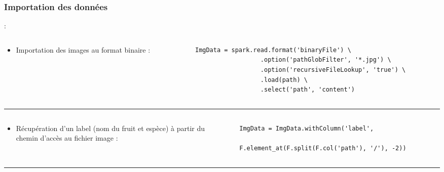 \documentclass[8pt,aspectratio=169,hyperref={unicode=true}]{beamer}
\begin{document}
\subsubsection{Importation des données}
\begin{frame}[fragile]{\insertsubsection : \insertsubsubsection}
  \begin{columns}
    \begin{column}{.25\textwidth}
      \begin{itemize}
        \item Importation des images au format binaire :
      \end{itemize}
    \end{column}
    \begin{column}{.75\textwidth}
      \begin{verbatim}
ImgData = spark.read.format('binaryFile') \
                  .option('pathGlobFilter', '*.jpg') \
                  .option('recursiveFileLookup', 'true') \
                  .load(path) \
                  .select('path', 'content')   
      \end{verbatim}
    \end{column}
  \end{columns}

  \vfill
  \hrule

  \begin{columns}
    \begin{column}{.25\textwidth}
      \begin{itemize}
        \item Récupération d'un label (nom du fruit et espèce) à partir du chemin d'accès au fichier image :
      \end{itemize}
    \end{column}
    \begin{column}{.75\textwidth}
      \begin{verbatim}
ImgData = ImgData.withColumn('label',
                             F.element_at(F.split(F.col('path'), '/'), -2))
      \end{verbatim}
    \end{column}
  \end{columns}

  \vfill
  \hrule


\end{frame}
\end{document}
